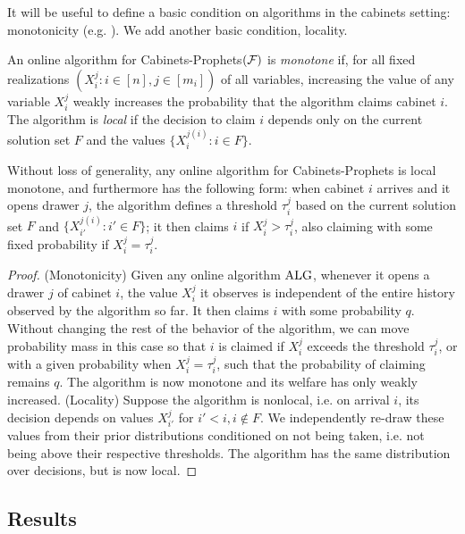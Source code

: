 It will be useful to define a basic condition on algorithms in the cabinets setting: monotonicity (e.g. \citet{kleinberg2012matroid}).
We add another basic condition, locality.
\begin{definition} \label{def:monotone}
  An online algorithm for Cabinets-Prophets$(\mathcal{F})$ is \emph{monotone} if, for all fixed realizations $(X_i^j : i \in [n], j \in [m_i])$ of all variables, increasing the value of any variable $X_i^j$ weakly increases the probability that the algorithm claims cabinet $i$.
  The algorithm is \emph{local} if the decision to claim $i$ depends only on the current solution set $F$ and the values $\{X_i^{j(i)} : i \in F\}$.
\end{definition}

\begin{observation} \label{obs:monotone}
  Without loss of generality, any online algorithm for Cabinets-Prophets is local monotone, and furthermore has the following form: when cabinet $i$ arrives and it opens drawer $j$, the algorithm defines a threshold $\tau_i^j$ based on the current solution set $F$ and $\{X_{i'}^{j(i)} : i' \in F\}$; it then claims $i$ if $X_i^j > \tau_i^j$, also claiming with some fixed probability if $X_i^j = \tau_i^j$.
\end{observation}
\begin{proof}
  (Monotonicity) Given any online algorithm $\mathrm{ALG}$, whenever it opens a drawer $j$ of cabinet $i$, the value $X_i^j$ it observes is independent of the entire history observed by the algorithm so far.
  It then claims $i$ with some probability $q$.
  Without changing the rest of the behavior of the algorithm, we can move probability mass in this case so that $i$ is claimed if $X_i^j$ exceeds the threshold $\tau_i^j$, or with a given probability when $X_i^j = \tau_i^j$, such that the probability of claiming remains $q$.
  The algorithm is now monotone and its welfare has only weakly increased.
  (Locality) Suppose the algorithm is nonlocal, i.e. on arrival $i$, its decision depends on values $X_{i'}^j$ for $i' < i, i \not\in F$.
  We independently re-draw these values from their prior distributions conditioned on not being taken, i.e. not being above their respective thresholds.
  The algorithm has the same distribution over decisions, but is now local.
\end{proof}


\subsection{Results}

